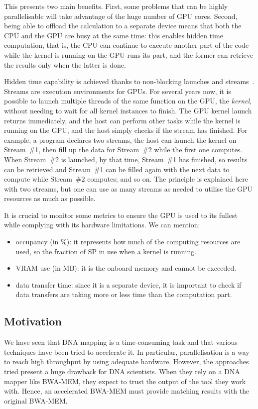 
This presents two main benefits. First, some problems that can be highly parallelisable will take advantage of the huge number of GPU cores. Second, being able to offload the calculation to a separate device means that both the CPU and the GPU are busy at the same time: this enables hidden time computation, that is, the CPU can continue to execute another part of the code while the kernel is running on the GPU runs its part, and the former can retrieve the results only when the latter is done.

Hidden time capability is achieved thanks to non-blocking launches and streams~\cite{misc:cudastreams}. Streams are execution environments for GPUs. For several years now, it is possible to launch multiple threads of the same function on the GPU, the \emph{kernel}, without needing to wait for all kernel instances to finish. The GPU kernel launch returns immediately, and the host can perform other tasks while the kernel is running on the GPU, and the host simply checks if the stream has finished. For example, a program declares two streams, the host can launch the kernel on Stream~\#1, then fill up the data for Stream~\#2 while the first one computes. When Stream~\#2 is launched, by that time, Stream~\#1 has finished, so results can be retrieved and Stream~\#1 can be filled again with the next data to compute while Stream~\#2 computes; and so on. The principle is explained here with two streams, but one can use as many streams as needed to utilise the GPU resources as much as possible.

It is crucial to monitor some metrics to ensure the GPU is used to its fullest while complying with its hardware limitations. We can mention:

\begin{itemize}
	\item occupancy (in \%): it represents how much of the computing resources are used, so the fraction of SP in use when a kernel is running.
	\item VRAM use (in MB): it is the onboard memory and cannot be exceeded.
	\item data transfer time: since it is a separate device, it is important to check if data transfers are taking more or less time than the computation part.
\end{itemize}

\subsection{Motivation}
We have seen that DNA mapping is a time-consuming task and that various techniques have been tried to accelerate it. In particular, parallelisation is a way to reach high throughput by using adequate hardware. However, the approaches tried present a huge drawback for DNA scientists. When they rely on a DNA mapper like BWA-MEM, they expect to trust the output of the tool they work with. Hence, an accelerated BWA-MEM must provide matching results with the original BWA-MEM.


